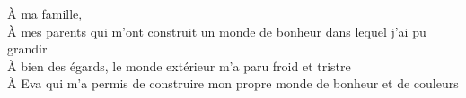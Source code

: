 \documentclass[
	a4paper, %
	fontsize=12pt, %
	twoside=true, %
	numbers=noenddot, %
]{kaobook}
\newenvironment{dedi}{\phantom{}\vfill\begin{flushright}\begin{minipage}{1.0\textwidth}\raggedleft}{\end{minipage}\end{flushright}\vfill}
\begin{document}
	
	
	






\begin{dedi}
    \`{A} ma famille,\\
    \`{A} mes parents qui m'ont construit un monde de bonheur dans lequel j'ai pu grandir \\
    \`{A} bien des égards, le monde extérieur m'a paru froid et tristre\\
    \`{A} Eva qui m'a permis de construire mon propre monde de bonheur et de couleurs\\
\end{dedi}


% 

\end{document}

